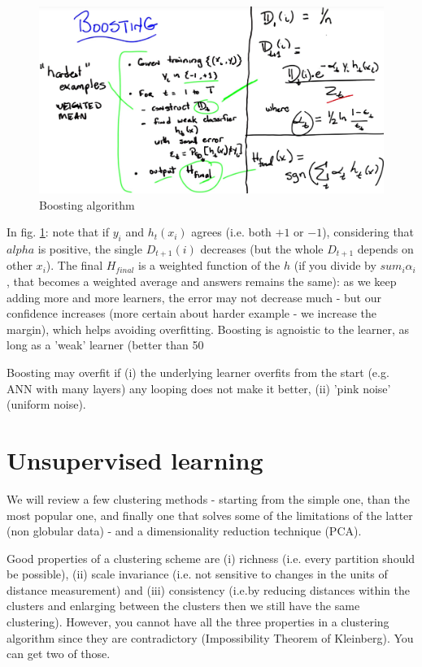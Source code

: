 \documentclass[11pt]{article}
\begin{document}
\begin{figure}[htbp] 
	\centering
	\includegraphics[width=.9\textwidth]{pics/boosting_1}
	\caption{Boosting algorithm} 
	\label{boosting_1}
\end{figure}
In fig. \ref{boosting_1}: note that if $y_i$ and $h_t(x_i)$ agrees (i.e. both $+1$ or $-1$), considering that $alpha$ is positive, the single $D_{t+1}(i)$ decreases (but the whole $D_{t+1}$ depends on other $x_i$). The final $H_{final}$ is a weighted function of the $h$ (if you divide by $sum_i \alpha_i$, that becomes a weighted average and answers remains the same): as we keep adding more and more learners, the error may not decrease much - but our confidence increases (more certain about harder example - we increase the margin), which helps avoiding overfitting. Boosting is agnoistic to the learner, as long as a 'weak' learner (better than 50%

Boosting may overfit if (i) the underlying learner overfits from the start (e.g. ANN with many layers) any looping does not make it better, (ii) 'pink noise' (uniform noise). 

\section{Unsupervised learning}
We will review a few clustering methods - starting from the simple one, than the most popular one, and finally one that solves some of the limitations of the latter (non globular data) - and a dimensionality reduction technique (PCA).

Good properties of a clustering scheme are (i) richness (i.e. every partition should be possible), (ii) scale invariance (i.e. not sensitive to changes in the units of distance measurement) and (iii) consistency (i.e.by reducing distances within the clusters and enlarging between the clusters then we still have the same clustering).
However, you cannot have all the three properties in a clustering algorithm since they are contradictory (Impossibility Theorem of Kleinberg). You can get two of those.
 
\end{document}
